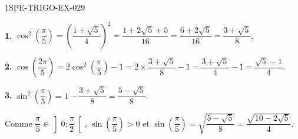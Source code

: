 \begin{corrige}{1SPE-TRIGO-EX-029}

\textbf{1.} $\cos^2\!\left(\dfrac{\pi}{5}\right) = \left(\dfrac{1+\sqrt{5}}{4}\right)^2 = \dfrac{1 + 2\sqrt{5} + 5}{16} = \dfrac{6+2\sqrt{5}}{16} = \dfrac{3+\sqrt{5}}{8}$.

\textbf{2.} $\cos\!\left(\dfrac{2\pi}{5}\right) = 2\cos^2\!\left(\dfrac{\pi}{5}\right) - 1 = 2 \times \dfrac{3+\sqrt{5}}{8} - 1 = \dfrac{3+\sqrt{5}}{4} - 1 = \dfrac{\sqrt{5}-1}{4}$.

\textbf{3.} $\sin^2\!\left(\dfrac{\pi}{5}\right) = 1 - \dfrac{3+\sqrt{5}}{8} = \dfrac{5-\sqrt{5}}{8}$.

Comme $\dfrac{\pi}{5} \in \left]0;\dfrac{\pi}{2}\right[$, $\sin\!\left(\dfrac{\pi}{5}\right) > 0$ et $\sin\!\left(\dfrac{\pi}{5}\right) = \sqrt{\dfrac{5-\sqrt{5}}{8}} = \dfrac{\sqrt{10-2\sqrt{5}}}{4}$.

\end{corrige}
